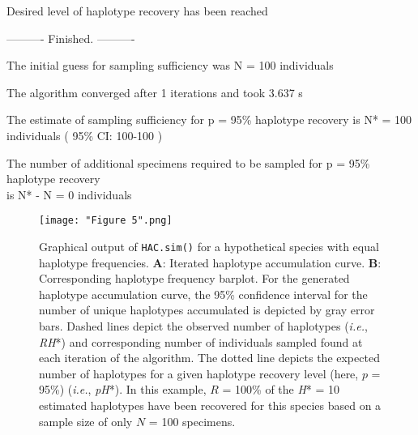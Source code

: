 {\noindent Desired level of haplotype recovery has been reached 

\vspace{3mm}

\noindent ---------- Finished. ----------
        
\noindent The initial guess for sampling sufficiency was N = 100 individuals
 
\noindent The algorithm converged after 1 iterations and took 3.637 s
 
\noindent The estimate of sampling sufficiency for p = 95\% haplotype recovery is N* = 100 \\ individuals ( 95\% CI: 100-100 )
 
\noindent The number of additional specimens required to be sampled for p = 95\% haplotype recovery \\ is N* - N = 0 individuals 

}

\vspace{2mm}


\begin{figure}[H]

\centering

\texttt{[image: "Figure 5".png]}

\caption{Graphical output of {\tt HAC.sim()} for a hypothetical species with equal haplotype frequencies. \textbf{A}: Iterated haplotype accumulation curve. \textbf{B}: Corresponding haplotype frequency barplot. For the generated haplotype accumulation curve, the 95\% confidence interval for the number of unique haplotypes accumulated is depicted by gray error bars. Dashed lines depict the observed number of haplotypes (\textit{i.e.}, \textit{RH}*) and corresponding number of individuals sampled found at each iteration of the algorithm. The dotted line depicts the expected number of haplotypes for a given haplotype recovery level (here, $p$ = 95\%) (\textit{i.e.}, \textit{pH}*). In this example, $R$ = 100\% of the \textit{H}* = 10 estimated haplotypes have been recovered for this species based on a sample size of only $N$ = 100 specimens.}

\end{figure}

\vspace{2mm}

